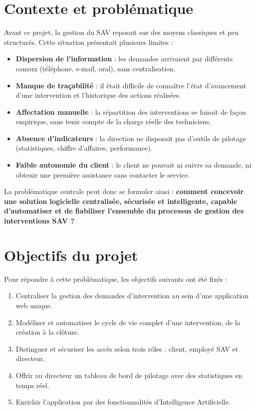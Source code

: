 \section{Contexte et problématique}
Avant ce projet, la gestion du SAV reposait sur des moyens classiques et peu structurés. Cette situation présentait plusieurs limites :
\begin{itemize}
  \item \textbf{Dispersion de l'information} : les demandes arrivaient par différents canaux (téléphone, e-mail, oral), sans centralisation.
  \item \textbf{Manque de traçabilité} : il était difficile de connaître l'état d'avancement d'une intervention et l'historique des actions réalisées.
  \item \textbf{Affectation manuelle} : la répartition des interventions se faisait de façon empirique, sans tenir compte de la charge réelle des techniciens.
  \item \textbf{Absence d'indicateurs} : la direction ne disposait pas d'outils de pilotage (statistiques, chiffre d'affaires, performance).
  \item \textbf{Faible autonomie du client} : le client ne pouvait ni suivre sa demande, ni obtenir une première assistance sans contacter le service.
\end{itemize}

La problématique centrale peut donc se formuler ainsi : \textbf{comment concevoir une solution logicielle centralisée, sécurisée et intelligente, capable d'automatiser et de fiabiliser l'ensemble du processus de gestion des interventions SAV ?}

\section{Objectifs du projet}
Pour répondre à cette problématique, les objectifs suivants ont été fixés :
\begin{enumerate}
  \item Centraliser la gestion des demandes d'intervention au sein d'une application web unique.
  \item Modéliser et automatiser le cycle de vie complet d'une intervention, de la création à la clôture.
  \item Distinguer et sécuriser les accès selon trois rôles : client, employé SAV et directeur.
  \item Offrir au directeur un tableau de bord de pilotage avec des statistiques en temps réel.
  \item Enrichir l'application par des fonctionnalités d'Intelligence Artificielle.
\end{enumerate}

